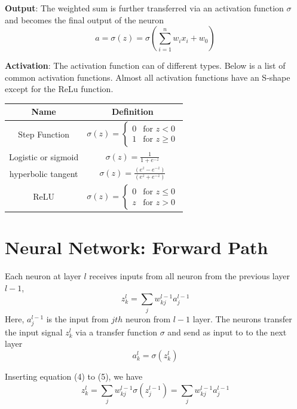 \documentclass[12pt, oneside]{article}
\begin{document}
\textbf{Output}: The weighted sum is further transferred via an activation function $\sigma$ and becomes the final output of the neuron
\begin{equation}
a=\sigma(z)=\sigma(\sum\limits_{i=1}^{n}w_i x_i+w_0)
\end{equation}

\textbf{Activation}: The activation function can of different types.  Below is a list of common activation functions. Almost all activation functions have an S-shape except for the ReLu function.
\begin{center}
\bgroup
\def\arraystretch{2.5}%
\begin{tabular}{c|c} 
Name & Definition\\
\hline
Step Function & $\sigma (z)={\begin{cases}0&{\text{for }}z<0\\1&{\text{for }}z\geq 0\end{cases}}$\\
\hline
Logistic or sigmoid & $\sigma(z)={\frac {1}{1+e^{-z}}}$\\
\hline
hyperbolic tangent &$\sigma(z)={\frac {(e^{z}-e^{-z})}{(e^{z}+e^{-z})}}$\\
\hline
ReLU & $\sigma(z)=\begin{cases}0&{\text{for }}z\leq 0\\z&{\text{for }}z>0\end{cases}$
\end{tabular}
\egroup
\end{center}


\section{Neural Network: Forward Path}
Each neuron at layer ${l}$ receives inputs from all neuron from the previous layer ${l-1}$,
\begin{equation}
{z_k^l=\sum_jw^{l-1}_{kj}a_j^{l-1}}
\end{equation}
Here, $a_j^{l-1}$ is the input from $jth$ neuron from $l-1$ layer. The neurons transfer the input signal $z_k^l$ via a transfer function $\sigma$ and send as input to to the next layer
\begin{equation}
a_k^l=\sigma(z_k^l)
\end{equation}

Inserting equation (4) to (5), we have 
\begin{equation}
z_k^l=\sum_jw^{l-1}_{kj}\sigma(z_j^{l-1})=\sum_jw^{l-1}_{kj}a_j^{l-1}
\end{equation}
\end{document}
